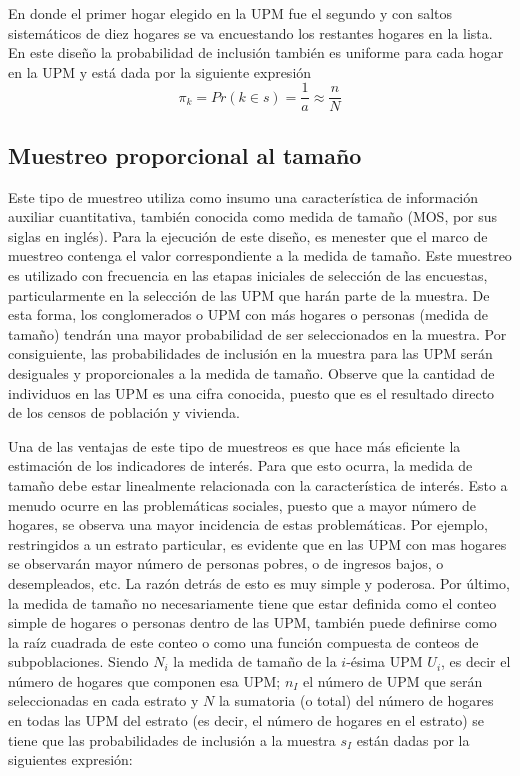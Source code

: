 \documentclass[
  12pt,
  spanish,
]{book}
\begin{document}
En donde el primer hogar elegido en la UPM fue el segundo y con saltos sistemáticos de diez hogares se va encuestando los restantes hogares en la lista. En este diseño la probabilidad de inclusión también es uniforme para cada hogar en la UPM y está dada por la siguiente expresión
\[\pi_k = Pr(k \in s) = \frac{1}{a} \approx \frac{n}{N}\]

\hypertarget{muestreo-proporcional-al-tamauxf1o}{%
\subsection*{Muestreo proporcional al tamaño}\label{muestreo-proporcional-al-tamauxf1o}}

Este tipo de muestreo utiliza como insumo una característica de información auxiliar cuantitativa, también conocida como medida de tamaño (MOS, por sus siglas en inglés). Para la ejecución de este diseño, es menester que el marco de muestreo contenga el valor correspondiente a la medida de tamaño. Este muestreo es utilizado con frecuencia en las etapas iniciales de selección de las encuestas, particularmente en la selección de las UPM que harán parte de la muestra. De esta forma, los conglomerados o UPM con más hogares o personas (medida de tamaño) tendrán una mayor probabilidad de ser seleccionados en la muestra. Por consiguiente, las probabilidades de inclusión en la muestra para las UPM serán desiguales y proporcionales a la medida de tamaño. Observe que la cantidad de individuos en las UPM es una cifra conocida, puesto que es el resultado directo de los censos de población y vivienda.

Una de las ventajas de este tipo de muestreos es que hace más eficiente la estimación de los indicadores de interés. Para que esto ocurra, la medida de tamaño debe estar linealmente relacionada con la característica de interés. Esto a menudo ocurre en las problemáticas sociales, puesto que a mayor número de hogares, se observa una mayor incidencia de estas problemáticas. Por ejemplo, restringidos a un estrato particular, es evidente que en las UPM con mas hogares se observarán mayor número de personas pobres, o de ingresos bajos, o desempleados, etc. La razón detrás de esto es muy simple y poderosa. Por último, la medida de tamaño no necesariamente tiene que estar definida como el conteo simple de hogares o personas dentro de las UPM, también puede definirse como la raíz cuadrada de este conteo o como una función compuesta de conteos de subpoblaciones. Siendo \(N_i\) la medida de tamaño de la \(i\)-ésima UPM \(U_i\), es decir el número de hogares que componen esa UPM; \(n_I\) el número de UPM que serán seleccionadas en cada estrato y \(N\) la sumatoria (o total) del número de hogares en todas las UPM del estrato (es decir, el número de hogares en el estrato) se tiene que las probabilidades de inclusión a la muestra \(s_I\) están dadas por la siguientes expresión:
\end{document}
